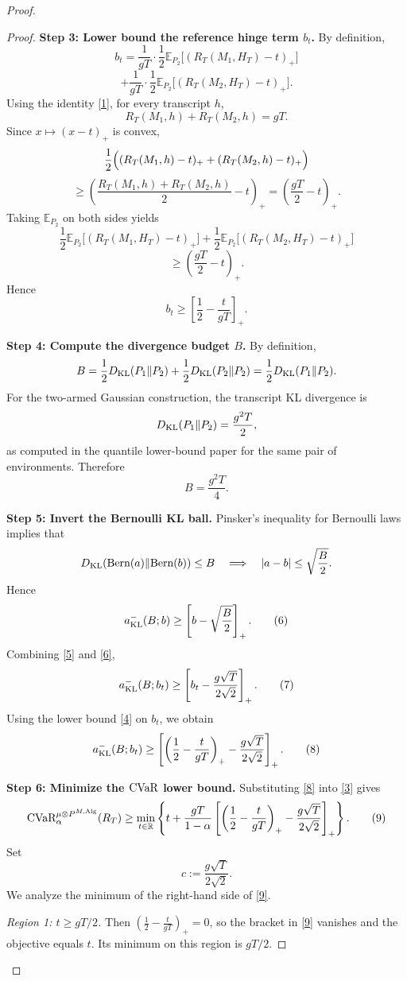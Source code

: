 \documentclass[conference]{IEEEtran}
\begin{document}
\begin{proof}[Proof]
\begin{proof}
\medskip
\noindent
\textbf{Step 3: Lower bound the reference hinge term \(b_t\).}
By definition,
\[
b_t
=
\frac{1}{gT}\cdot \frac12
\mathbb{E}_{P_2}\big[(R_T(M_1,H_T)-t)_+\big]
\]
\[
+
\frac{1}{gT}\cdot \frac12
\mathbb{E}_{P_2}\big[(R_T(M_2,H_T)-t)_+\big].
\]
Using the identity \eqref{1}, for every transcript \(h\),
\[
R_T(M_1,h)+R_T(M_2,h)=gT.
\]
Since \(x\mapsto (x-t)_+\) is convex,
\[
\frac12\Bigl((R_T(M_1,h)-t)_+ + (R_T(M_2,h)-t)_+\Bigr)\]
\[
\ge
\left(\frac{R_T(M_1,h)+R_T(M_2,h)}{2}-t\right)_+
=
\left(\frac{gT}{2}-t\right)_+.
\]
Taking \(\mathbb{E}_{P_2}\) on both sides yields
\[
\frac12\mathbb{E}_{P_2}\big[(R_T(M_1,H_T)-t)_+\big]
+
\frac12\mathbb{E}_{P_2}\big[(R_T(M_2,H_T)-t)_+\big]\]
\[
\ge
\left(\frac{gT}{2}-t\right)_+.
\]
Hence
\[
b_t
\ge
\left[\frac12-\frac{t}{gT}\right]_+.
\tag{4}
\]

\medskip
\noindent
\textbf{Step 4: Compute the divergence budget \(B\).}
By definition,
\[
B
=
\frac12 D_{\textup{KL}}(P_1\|P_2)
+
\frac12 D_{\textup{KL}}(P_2\|P_2)
=
\frac12 D_{\textup{KL}}(P_1\|P_2).
\]
For the two-armed Gaussian construction, the transcript KL divergence is
\[
D_{\textup{KL}}(P_1\|P_2)=\frac{g^2T}{2},
\]
as computed in the quantile lower-bound paper for the same pair of environments.
Therefore
\[
B=\frac{g^2T}{4}.
\tag{5}
\]

\medskip
\noindent
\textbf{Step 5: Invert the Bernoulli KL ball.}
Pinsker's inequality for Bernoulli laws implies that
\[
D_{\textup{KL}}(\textup{Bern}(a)\|\textup{Bern}(b))\le B
\quad\Longrightarrow\quad
|a-b|\le \sqrt{\frac{B}{2}}.
\]
Hence
\[
a^{-}_{\textup{KL}}(B;b)\ge \left[b-\sqrt{\frac{B}{2}}\right]_+.
\tag{6}
\]
Combining \eqref{5} and \eqref{6},
\[
a^{-}_{\textup{KL}}(B;b_t)
\ge
\left[b_t-\frac{g\sqrt{T}}{2\sqrt{2}}\right]_+.
\tag{7}
\]
Using the lower bound \eqref{4} on \(b_t\), we obtain
\[
a^{-}_{\textup{KL}}(B;b_t)
\ge
\left[
\left(\frac12-\frac{t}{gT}\right)_+
-
\frac{g\sqrt{T}}{2\sqrt{2}}
\right]_+.
\tag{8}
\]

\medskip
\noindent
\textbf{Step 6: Minimize the \(\textup{CVaR}\) lower bound.}
Substituting \eqref{8} into \eqref{3} gives
\[
\textup{CVaR}_\alpha^{\mu\otimes P^{M,\textup{Alg}}}(R_T)
\ge
\min_{t\in\mathbb{R}}
\left\{
t+\frac{gT}{1-\alpha}
\left[
\left(\frac12-\frac{t}{gT}\right)_+
-
\frac{g\sqrt{T}}{2\sqrt{2}}
\right]_+
\right\}.
\tag{9}
\]
Set
\[
c:=\frac{g\sqrt{T}}{2\sqrt{2}}.
\]
We analyze the minimum of the right-hand side of \eqref{9}.

\smallskip
\noindent
\emph{Region 1: \(t\ge gT/2\).}
Then \(\left(\frac12-\frac{t}{gT}\right)_+=0\), so the bracket in \eqref{9} vanishes and the objective equals \(t\). Its minimum on this region is \(gT/2\).


\end{proof}
\end{proof}
\end{document}
